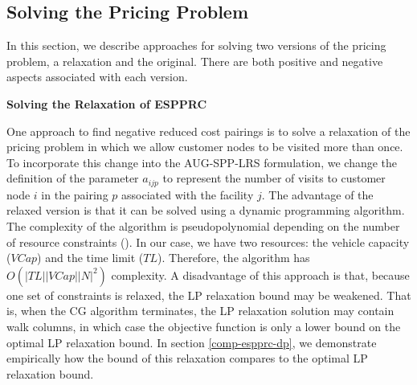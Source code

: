 \subsection{Solving the Pricing Problem}
\label{Solve-pricing}
In this section, we describe approaches for solving two versions of the pricing problem, a relaxation 
and the original. There are both positive and negative aspects associated with each version. 

{\bf Solving the Relaxation of ESPPRC}

One approach to find negative reduced cost pairings is to solve a relaxation of the pricing problem in which we 
allow customer nodes to be visited more than once. To incorporate this change into the AUG-SPP-LRS formulation, we change the 
definition of the parameter $a_{ijp}$ to represent the number of visits to customer node $i$ in the pairing $p$ 
associated with the facility $j$. The advantage of the relaxed version is that it can be solved using a dynamic 
programming algorithm. The complexity of the algorithm 
is pseudopolynomial depending on the number of resource constraints (\cite{Beasley}). In our 
case, we have two resources: the vehicle capacity ($VCap$) and the time limit ($TL$). Therefore, the algorithm
has $O(|TL| |VCap| |N|^2)$ complexity. A disadvantage of this approach is that, because one  set of constraints 
is relaxed, the LP relaxation bound may be weakened. That is,  when the CG algorithm
terminates, the LP relaxation solution may contain walk columns, in which case the objective function is only 
a lower bound on the optimal LP relaxation bound. In section \ref{comp-espprc-dp}, we demonstrate empirically
how the bound of this relaxation compares to the optimal LP relaxation bound. 

